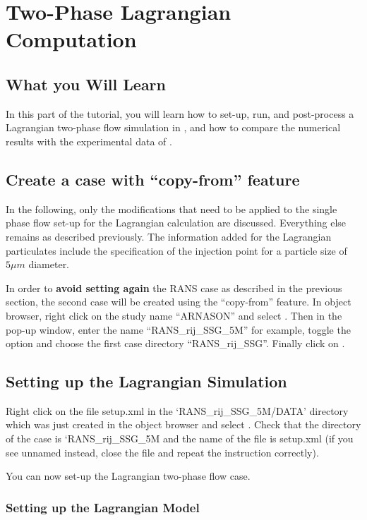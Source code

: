 \section{Two-Phase Lagrangian Computation}

\subsection{What you Will Learn}

In this part of the tutorial, you will learn how to set-up, run, and post-process a Lagrangian two-phase flow simulation in \CS, and how to compare the numerical results with the experimental data of \cite{Arnason}.

\subsection{Create a case with ``copy-from'' feature}

In the following, only the modifications that need to be applied to the single phase flow set-up for the Lagrangian calculation are discussed.  Everything else remains as described previously. The information added for the Lagrangian particulates include the specification of the injection point for a particle size of $5\mu m$ diameter.

In order to {\bf avoid setting again} the RANS case as described in the previous section, the second case will be created using the ``copy-from'' feature. In \salome object browser, right click on the study name ``ARNASON'' and select . Then in the pop-up window, enter the name ``RANS\_rij\_SSG\_5M'' for example, toggle the option  and choose the first case directory ``RANS\_rij\_SSG''. Finally click on .

\subsection{Setting up the Lagrangian Simulation}

Right click on the file setup.xml in the ‘RANS\_rij\_SSG\_5M/DATA’ directory which was just created in the object browser and select . Check that the directory of the case is ‘RANS\_rij\_SSG\_5M and the name of the file is setup.xml (if you see unnamed instead, close the file and repeat the instruction correctly).

You can now set-up the Lagrangian two-phase flow case.

\subsubsection{Setting up the Lagrangian Model}

